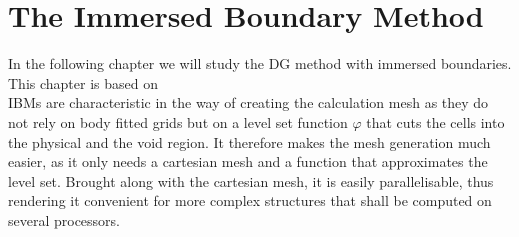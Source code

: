\chapter{The Immersed Boundary Method}
\label{immersedBoundaries}
In the following chapter we will study the DG method with immersed boundaries. This chapter is based on \cite{paper} \\ \indent 
IBMs are characteristic in the way of creating the calculation mesh as they do not rely on body fitted grids but on a level set function $\varphi$ that cuts the cells into the physical and the void region. It therefore makes the mesh generation much easier, as it only needs a cartesian mesh and a function that approximates the level set. Brought along with the cartesian mesh, it is easily parallelisable, thus rendering it convenient for more complex structures that shall be computed on several processors.
